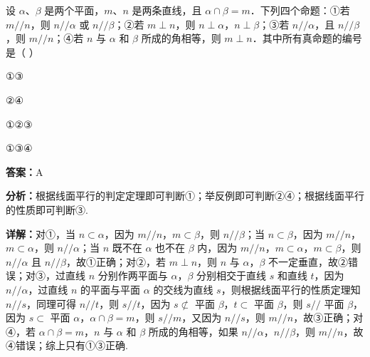\begin{question}[points=5]
设 $\alpha$、$\beta$ 是两个平面，$m$、$n$ 是两条直线，且 $\alpha \cap \beta = m$．下列四个命题：①若 $m // n$，则 $n // \alpha$ 或 $n // \beta$；②若 $m \perp n$，则 $n \perp \alpha$，$n \perp \beta$；③若 $n // \alpha$，且 $n // \beta$，则 $m // n$；④若 $n$ 与 $\alpha$ 和 $\beta$ 所成的角相等，则 $m \perp n$．其中所有真命题的编号是（ ）
\begin{choices}
  \item ①③
  \item ②④
  \item ①②③
  \item ①③④
\end{choices}
\begin{solution}
\textbf{答案：}A

\textbf{分析：}根据线面平行的判定定理即可判断①；举反例即可判断②④；根据线面平行的性质即可判断③.

\textbf{详解：}对①，当 $n \subset \alpha$，因为 $m // n$，$m \subset \beta$，则 $n // \beta$；当 $n \subset \beta$，因为 $m // n$，$m \subset \alpha$，则 $n // \alpha$；当 $n$ 既不在 $\alpha$ 也不在 $\beta$ 内，因为 $m // n$，$m \subset \alpha$，$m \subset \beta$，则 $n // \alpha$ 且 $n // \beta$，故①正确；对②，若 $m \perp n$，则 $n$ 与 $\alpha$，$\beta$ 不一定垂直，故②错误；对③，过直线 $n$ 分别作两平面与 $\alpha$，$\beta$ 分别相交于直线 $s$ 和直线 $t$，因为 $n // \alpha$，过直线 $n$ 的平面与平面 $\alpha$ 的交线为直线 $s$，则根据线面平行的性质定理知 $n // s$，同理可得 $n // t$，则 $s // t$，因为 $s \not\subset$ 平面 $\beta$，$t \subset$ 平面 $\beta$，则 $s //$ 平面 $\beta$，因为 $s \subset$ 平面 $\alpha$，$\alpha \cap \beta = m$，则 $s // m$，又因为 $n // s$，则 $m // n$，故③正确；对④，若 $\alpha \cap \beta = m$，$n$ 与 $\alpha$ 和 $\beta$ 所成的角相等，如果 $n // \alpha$，$n // \beta$，则 $m // n$，故④错误；综上只有①③正确.
\end{solution}
\end{question}

